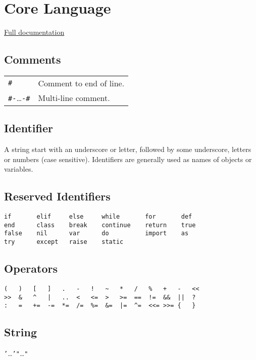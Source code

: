 \section*{Core Language}

\hangpar \href{https://github.com/berry-lang/berry/wiki/Reference}{Full documentation}

\subsection*{Comments}
\begin{tabular}{@{}ll}
\texttt{\#} & Comment to end of line. \\
\texttt{\#-}\dots\texttt{-\#} & Multi-line comment.
\end{tabular}

\subsection*{Identifier}
A string start with an underscore or letter, followed by some underscore, letters or numbers (case sensitive). Identifiers are generally used as names of objects or variables.

\subsection*{Reserved Identifiers}
\begin{lstlisting}[numbers=none]
if       elif     else     while       for       def
end      class    break    continue    return    true
false    nil      var      do          import    as
try      except   raise    static
\end{lstlisting}

\subsection*{Operators}
\begin{lstlisting}[numbers=none]
(   )   [   ]   .   -   !   ~   *   /   %   +   -   <<  
>>  &   ^   |   ..  <   <=  >   >=  ==  !=  &&  ||  ?
:   =   +=  -=  *=  /=  %=  &=  |=  ^=  <<= >>= {   }
\end{lstlisting}

\subsection*{String}
\texttt{'}\dots\texttt{'}\quad\texttt{"}\dots\texttt{"}


